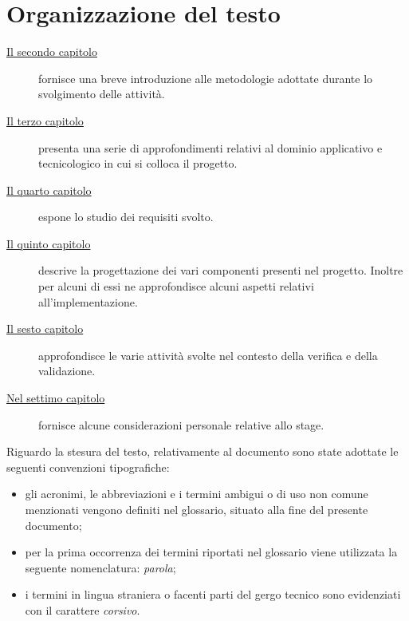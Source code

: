 \section{Organizzazione del testo}

\begin{description}
    \item[{\hyperref[cap:processi-metodologie]{Il secondo capitolo}}] fornisce una breve introduzione alle metodologie adottate durante lo svolgimento delle attività.
    
    \item[{\hyperref[cap:descrizione-stage]{Il terzo capitolo}}] presenta una serie di approfondimenti relativi al dominio applicativo e tecnicologico in cui si colloca il progetto.
    
    \item[{\hyperref[cap:analisi-requisiti]{Il quarto capitolo}}] espone lo studio dei requisiti svolto.
    
    \item[{\hyperref[cap:progettazione-codifica]{Il quinto capitolo}}] descrive la progettazione dei vari componenti presenti nel progetto. Inoltre per alcuni di essi ne approfondisce alcuni aspetti relativi all'implementazione.
    
    \item[{\hyperref[cap:verifica-validazione]{Il sesto capitolo}}] approfondisce le varie attività svolte nel contesto della verifica e della validazione.
    
    \item[{\hyperref[cap:conclusioni]{Nel settimo capitolo}}] fornisce alcune considerazioni personale relative allo stage.
\end{description}

Riguardo la stesura del testo, relativamente al documento sono state adottate le seguenti convenzioni tipografiche:
\begin{itemize}
	\item gli acronimi, le abbreviazioni e i termini ambigui o di uso non comune menzionati vengono definiti nel glossario, situato alla fine del presente documento;
	\item per la prima occorrenza dei termini riportati nel glossario viene utilizzata la seguente nomenclatura: \emph{parola}\glsfirstoccur;
	\item i termini in lingua straniera o facenti parti del gergo tecnico sono evidenziati con il carattere \emph{corsivo}.
\end{itemize}